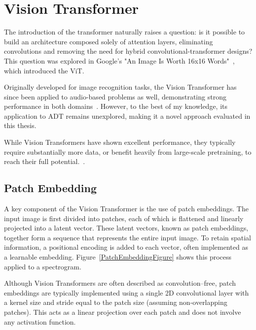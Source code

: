 \section{Vision Transformer}

The introduction of the transformer naturally raises a question: is it possible to build an architecture composed solely of attention layers, eliminating convolutions and removing the need for hybrid convolutional-transformer designs? This question was explored in Google's "An Image Is Worth 16x16 Words"~\cite{dosovitskiy2021imageworth16x16words}, which introduced the \gls{ViT}.

Originally developed for image recognition tasks, the Vision Transformer has since been applied to audio-based problems as well, demonstrating strong performance in both domains~\cite{dosovitskiy2021imageworth16x16words, gong2021astaudiospectrogramtransformer}. However, to the best of my knowledge, its application to \gls{ADT} remains unexplored, making it a novel approach evaluated in this thesis.

While Vision Transformers have shown excellent performance, they typically require substantially more data, or benefit heavily from large-scale pretraining, to reach their full potential.~\cite{dosovitskiy2021imageworth16x16words}.

\subsection{Patch Embedding}

A key component of the Vision Transformer is the use of patch embeddings. The input image is first divided into patches, each of which is flattened and linearly projected into a latent vector. These latent vectors, known as patch embeddings, together form a sequence that represents the entire input image. To retain spatial information, a positional encoding is added to each vector, often implemented as a learnable embedding. Figure~\ref{PatchEmbeddingFigure} shows this process applied to a spectrogram.

Although Vision Transformers are often described as convolution–free, patch embeddings are typically implemented using a single 2D convolutional layer with a kernel size and stride equal to the patch size (assuming non-overlapping patches). This acts as a linear projection over each patch and does not involve any activation function.

